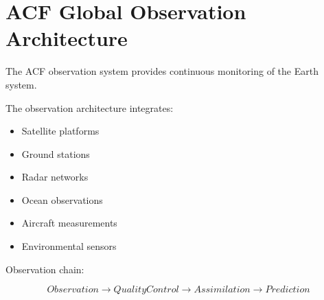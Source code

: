 \section{ACF Global Observation Architecture}


The ACF observation system provides continuous monitoring of
the Earth system.



The observation architecture integrates:


\begin{itemize}

\item Satellite platforms

\item Ground stations

\item Radar networks

\item Ocean observations

\item Aircraft measurements

\item Environmental sensors

\end{itemize}



Observation chain:


\[
Observation
\rightarrow
Quality Control
\rightarrow
Assimilation
\rightarrow
Prediction
\]
